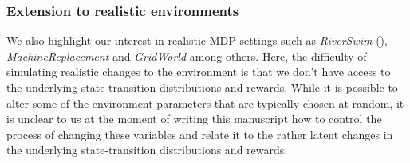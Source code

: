 \documentclass{article} %
\begin{document}
\subsubsection{Extension to realistic environments}
We also highlight our interest in realistic MDP settings such as \textit{RiverSwim} (\cite{Rswim}), \textit{MachineReplacement} and \textit{GridWorld} among others. Here, the difficulty of simulating realistic changes to the environment is that we don't have access to the underlying state-transition distributions and rewards. While it is possible to alter some of the environment parameters that are typically chosen at random, it is unclear to us at the moment of writing this manuscript how to control the process of changing these variables and relate it to the rather latent changes in the underlying state-transition distributions and rewards. 


\end{document}
